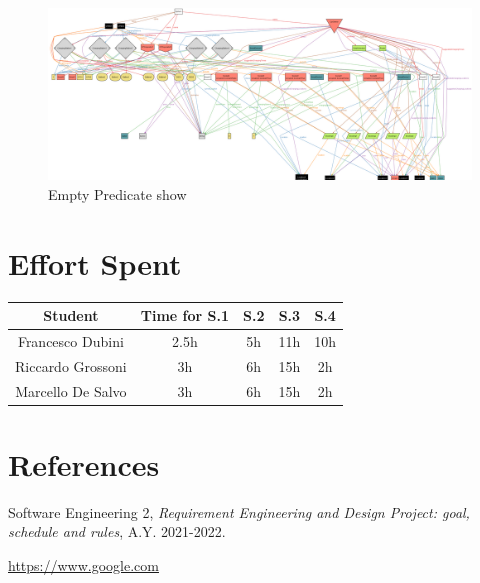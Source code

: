 \documentclass[table, 12pt]{article} %
\begin{document}
    \begin{figure}
        \centering
            \includegraphics[scale=0.35, center]{assets/alloy/run_show_all.png}
            \caption{Empty Predicate show}
            \label{fig: show_full_alloy}
    \end{figure}
    
    \newpage
    \section{Effort Spent}
        \begin{tabular}{| c || c | c| c| c |}
            \hline
            Student & Time for S.1 & S.2 & S.3 & S.4 \\ \hline
            Francesco Dubini & 2.5h & 5h & 11h & 10h \\
            Riccardo Grossoni & 3h & 6h & 15h & 2h \\
            Marcello De Salvo & 3h & 6h & 15h & 2h \\
            \hline
        \end{tabular}
    \section{References}

    \begin{thebibliography}{9}
        Software Engineering 2,
        \emph{Requirement Engineering and Design Project: goal, schedule and rules}, A.Y. 2021-2022.

        \url{https://www.google.com}


    \end{thebibliography}
\end{document}
